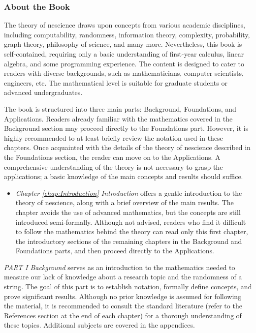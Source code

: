 %
%

\subsubsection*{About the Book}

The theory of nescience draws upon concepts from various academic disciplines, including computability, randomness, information theory, complexity, probability, graph theory, philosophy of science, and many more. Nevertheless, this book is self-contained, requiring only a basic understanding of first-year calculus, linear algebra, and some programming experience. The content is designed to cater to readers with diverse backgrounds, such as mathematicians, computer scientists, engineers, etc. The mathematical level is suitable for graduate students or advanced undergraduates.

The book is structured into three main parts: Background, Foundations, and Applications. Readers already familiar with the mathematics covered in the Background section may proceed directly to the Foundations part. However, it is highly recommended to at least briefly review the notation used in these chapters. Once acquainted with the details of the theory of nescience described in the Foundations section, the reader can move on to the Applications. A comprehensive understanding of the theory is not necessary to grasp the applications; a basic knowledge of the main concepts and results should suffice.

\bigskip

\begin{itemize}

\item \emph{Chapter \ref{chap:Introduction} Introduction} offers a gentle introduction to the theory of nescience, along with a brief overview of the main results. The chapter avoids the use of advanced mathematics, but the concepts are still introduced semi-formally. Although not advised, readers who find it difficult to follow the mathematics behind the theory can read only this first chapter, the introductory sections of the remaining chapters in the Background and Foundations parts, and then proceed directly to the Applications.

\end{itemize}

\bigskip

\emph{PART I Background} serves as an introduction to the mathematics needed to measure our lack of knowledge about a research topic and the randomness of a string. The goal of this part is to establish notation, formally define concepts, and prove significant results. Although no prior knowledge is assumed for following the material, it is recommended to consult the standard literature (refer to the References section at the end of each chapter) for a thorough understanding of these topics. Additional subjects are covered in the appendices.


